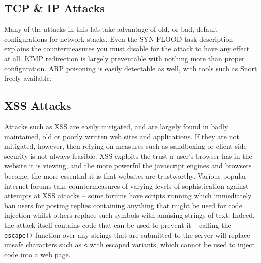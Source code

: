 \subsection{TCP \& IP Attacks}

Many of the attacks in this lab take advantage of old, or bad, default configurations for network stacks. Even the
SYN-FLOOD task description explains the countermeasures you must disable for the attack to have any effect at all. ICMP
redirection is largely preventable with nothing more than proper configuration\cite{sysctl}.
ARP poisoning is easily detectable as well, with tools such as Snort freely available\cite{snort}\cite{snort_arp}.

\subsection{XSS Attacks}

Attacks such as XSS are easily mitigated\cite{cheatsheet}, and are largely found in badly maintained, old or poorly
written web sites and applications. If they are not mitigated, however, then relying on measures such as sandboxing or
client-side security is not always feasible. XSS exploits the trust a user's browser has in the website it is viewing,
and the more powerful the javascript engines and browsers become, the more essential it is that websites are
trustworthy. Various popular internet forums take countermeasures of varying levels of sophistication against attempts
at XSS attacks -- some forums have scripts running which immediately ban users for posting replies containing
anything that might be used for code injection whilst others replace such symbols with amusing strings of text. Indeed,
the attack itself contains code that can be used to prevent it -- calling the {\tt escape()} function over any strings
that are submitted to the server will replace unsafe characters such as {\tt <} with escaped variants, which cannot be
used to inject code into a web page.
